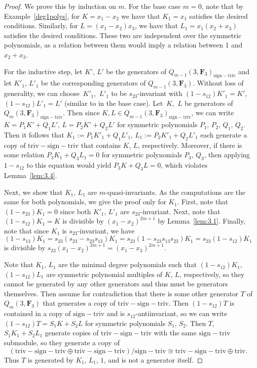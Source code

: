 \documentclass[pdftex]{sigma}
\theoremstyle{definition}
\numberwithin{equation}{section}
\newcommand{\triv}{\mathrm{triv}}
\newcommand{\trix}{\mathrm{triv-sign-triv}}
\newcommand{\siv}{\mathrm{sign-triv}}
\begin{document}
 \begin{proof}
 We prove this by induction on $m$. For the base case $m=0$, note that by Example~\ref{deg1polys}, for ${K=x_1-x_2}$ we have that $K_1=x_1$ satisfies the desired conditions. Similarly, for $L=(x_1-x_2)x_3$, we have that $L_1=x_1(x_2+x_3)$ satisfies the desired conditions. These two are independent over the symmetric polynomials, as a relation between them would imply a relation between 1 and~${x_2+x_3}$.

 For the inductive step, let $K'$, $L'$ be the generators of $Q_{m-1}(3,\mathbf{F}_3)_\siv$ and let $K'_1$, $L'_1$ be the corresponding generators of $Q_{m-1}(3,\mathbf{F}_3)$. Without loss of generality, we can choose~$K'_1$,~$L'_1$ to be $s_{23}$-invariant with $(1-s_{12})K'_1=K'$, $(1-s_{12})L'_1=L'$ (similar to in the base case). Let~$K$,~$L$ be generators of $Q_m(3,\mathbf{F}_3)_\siv$. Then since $K,L\in Q_{m-1}(3,\mathbf{F}_3)_\siv$, we can write $K=P_1K'+Q_1L'$, $L=P_2K'+Q_2L'$ for symmetric polynomials $P_1$, $P_2$, $Q_1$, $Q_2$. Then it follows that $K_1:=P_1K'_1+Q_1L'_1$, $L_1:=P_2K'_1+Q_2L'_1$ each generate a copy of $\trix$ that contains $K$, $L$, respectively. Moreover, if there is some relation $P_3K_1+Q_3L_1=0$ for symmetric polynomials $P_3$, $Q_3$, then applying $1-s_{12}$ to this equation would yield $P_3K+Q_3L=0$, which violates Lemma~\ref{lem:3.4}.

 Next, we show that $K_1$, $L_1$ are $m$-quasi-invariants. As the computations are the same for both polynomials, we give the proof only for $K_1$. First, note that $(1-s_{23})K_1=0$ since both $K'_1$, $L'_1$ are $s_{23}$-invariant. Next, note that $(1-s_{12})K_1=K$ is divisible by $(x_1-x_2)^{2m+1}$ by Lemma~\ref{lem:3.1}. Finally, note that since $K_1$ is $s_{23}$-invariant, we have
 \[(1-s_{13})K_1=s_{23}(s_{23}-s_{23}s_{13})K_1=s_{23}(1-s_{23}s_{13}s_{23})K_1=s_{23}(1-s_{12})K_1\]
 is divisible by $s_{23}(x_1-x_2)^{2m+1}=(x_1-x_3)^{2m+1}$.

 Note that $K_1$, $L_1$ are the minimal degree polynomials such that $(1-s_{12})K_1$, $(1-s_{12})L_1$ are symmetric polynomial multiples of $K$, $L$, respectively, so they cannot be generated by any other generators and thus must be generators themselves. Then assume for contradiction that there is some other generator $T$ of $Q_m(3,\mathbf{F}_3)$ that generates a copy of $\trix$. Then $(1-s_{12})T$ is contained in a copy of $\siv$ and is $s_{12}$-antiinvariant, so we can write $(1-s_{12})T=S_1K+S_2L$ for symmetric polynomials $S_1$, $S_2$. Then $T$,
 $S_1K_1+S_2L_1$ generate copies of $\trix$ with the same $\siv$ submodule, so they generate a copy of
 \[(\trix\oplus\trix)/\siv\cong\trix\oplus\triv. \]
 Thus $T$ is generated by $K_1$, $L_1$, $1$, and is not a generator itself.
 \end{proof}
\end{document}
